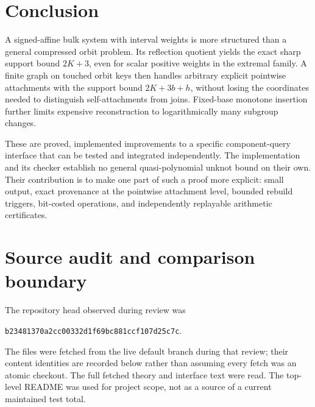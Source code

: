 \documentclass[11pt]{article}
\theoremstyle{definition}
\newcommand{\code}[1]{\texttt{#1}}
\begin{document}
\section{Conclusion}
A signed-affine bulk system with interval weights is more structured than a general compressed orbit problem. Its reflection quotient yields the exact sharp support bound $2K+3$, even for scalar positive weights in the extremal family. A finite graph on touched orbit keys then handles arbitrary explicit pointwise attachments with the support bound $2K+3b+h$, without losing the coordinates needed to distinguish self-attachments from joins. Fixed-base monotone insertion further limits expensive reconstruction to logarithmically many subgroup changes.

These are proved, implemented improvements to a specific component-query interface that can be tested and integrated independently. The implementation and its checker establish no general quasi-polynomial unknot bound on their own. Their contribution is to make one part of such a proof more explicit: small output, exact provenance at the pointwise attachment level, bounded rebuild triggers, bit-costed operations, and independently replayable arithmetic certificates.

\appendix
\section{Source audit and comparison boundary}
\label{app:sources}
The repository head observed during review was
\begin{center}\small{\footnotesize\code{b23481370a2cc00332d1f69bc881ccf107d25c7c}}.\end{center}
The files were fetched from the live default branch during that review; their content identities are recorded below rather than assuming every fetch was an atomic checkout. The full fetched theory and interface text were read. The top-level README was used for project scope, not as a source of a current maintained test total.
\end{document}
